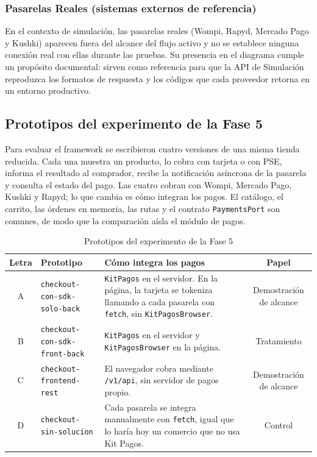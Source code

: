 \subsubsection{Pasarelas Reales (sistemas externos de referencia)}
En el contexto de simulación, las pasarelas reales (Wompi, Rapyd, Mercado Pago y Kushki) aparecen fuera del alcance del flujo activo y no se establece ninguna conexión real con ellas durante las pruebas. Su presencia en el diagrama cumple un propósito documental: sirven como referencia para que la API de Simulación reproduzca los formatos de respuesta y los códigos que cada proveedor retorna en un entorno productivo.

\subsection{Prototipos del experimento de la Fase 5}
Para evaluar el framework se escribieron cuatro versiones de una misma tienda reducida. Cada una muestra un producto, lo cobra con tarjeta o con PSE, informa el resultado al comprador, recibe la notificación asíncrona de la pasarela y consulta el estado del pago. Las cuatro cobran con Wompi, Mercado Pago, Kushki y Rapyd; lo que cambia es cómo integran los pagos. El catálogo, el carrito, las órdenes en memoria, las rutas y el contrato \texttt{PaymentsPort} son comunes, de modo que la comparación aísla el módulo de pagos.

\begin{table}[htbp]
\centering
\caption{Prototipos del experimento de la Fase 5}
\label{tab:prototipos}
\renewcommand{\arraystretch}{1.3}
\begin{tabularx}{\textwidth}{|c|>{\raggedright\arraybackslash}p{3.6cm}|X|c|}
\hline
\textbf{Letra} & \textbf{Prototipo} & \textbf{Cómo integra los pagos} & \textbf{Papel} \\ \hline
A & \texttt{checkout-\allowbreak{}con-\allowbreak{}sdk-\allowbreak{}solo-\allowbreak{}back} & \texttt{KitPagos} en el servidor. En la página, la tarjeta se tokeniza llamando a cada pasarela con \texttt{fetch}, sin \texttt{KitPagosBrowser}. & Demostración de alcance \\ \hline
B & \texttt{checkout-\allowbreak{}con-\allowbreak{}sdk-\allowbreak{}front-\allowbreak{}back} & \texttt{KitPagos} en el servidor y \texttt{KitPagosBrowser} en la página. & Tratamiento \\ \hline
C & \texttt{checkout-\allowbreak{}frontend-\allowbreak{}rest} & El navegador cobra mediante \texttt{/v1/api}, sin servidor de pagos propio. & Demostración de alcance \\ \hline
D & \texttt{checkout-\allowbreak{}sin-\allowbreak{}solucion} & Cada pasarela se integra manualmente con \texttt{fetch}, igual que lo haría hoy un comercio que no usa Kit Pagos. & Control \\ \hline
\end{tabularx}
\end{table}

